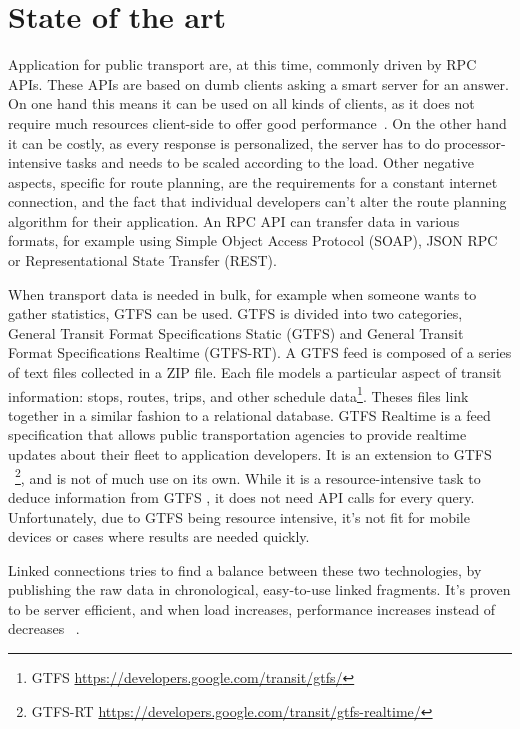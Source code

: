 \documentclass[twocolumn]{phdsymp} %
\begin{document}
\section{State of the art}
Application for public transport are, at this time, commonly driven by \textsc{RPC} APIs. These APIs are based on dumb clients asking a smart server for an answer. On one hand this means it can be used on all kinds of clients, as it does not require much resources client-side to offer good performance~\cite{Nelson81}. On the other hand it can be costly, as every response is personalized, the server has to do processor-intensive tasks and needs to be scaled according to the load. Other negative aspects, specific for route planning, are the requirements for a constant internet connection, and the fact that individual developers can’t alter the route planning algorithm for their application. An \textsc{RPC} API can transfer data in various formats, for example using Simple Object Access Protocol (SOAP), JSON \textsc{RPC} or Representational State Transfer (REST). 

When transport data is needed in bulk, for example when someone wants to gather statistics, \textsc{GTFS}  can be used. \textsc{GTFS}  is divided into two categories, General Transit Format Specifications Static (GTFS) and General Transit Format Specifications Realtime (GTFS-RT). A \textsc{GTFS}  feed is composed of a series of text files collected in a ZIP file. Each file models a particular aspect of transit information: stops, routes, trips, and other schedule data\footnote{GTFS \url{https://developers.google.com/transit/gtfs/}}. Theses files link together in a similar fashion to a relational database. \textsc{GTFS}  Realtime is a feed specification that allows public transportation agencies to provide realtime updates about their fleet to application developers. It is an extension to \textsc{GTFS} ~\footnote{GTFS-RT \url{https://developers.google.com/transit/gtfs-realtime/}}, and is not of much use on its own.
While it is a resource-intensive task to deduce information from \textsc{GTFS} , it does not need API calls for every query. Unfortunately, due to \textsc{GTFS}  being resource intensive, it’s not fit for mobile devices or cases where results are needed quickly.

Linked connections tries to find a balance between these two technologies, by publishing the raw data in chronological, easy-to-use linked fragments. It’s proven to be server efficient, and when load increases, performance increases instead of decreases ~\cite{colpaert17}.
\end{document}
